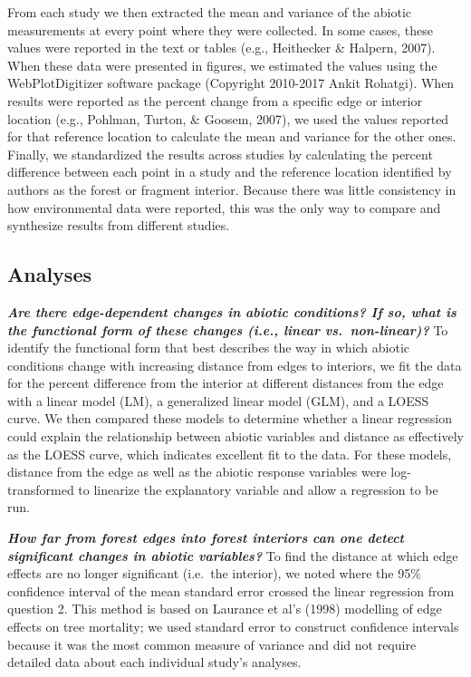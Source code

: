 \documentclass[
  man]{apa6}
\begin{document}
From each study we then extracted the mean and variance of the abiotic measurements at every point where they were collected. In some cases, these values were reported in the text or tables (e.g., Heithecker \& Halpern, 2007). When these data were presented in figures, we estimated the values using the WebPlotDigitizer software package (Copyright 2010-2017 Ankit Rohatgi). When results were reported as the percent change from a specific edge or interior location (e.g., Pohlman, Turton, \& Goosem, 2007), we used the values reported for that reference location to calculate the mean and variance for the other ones. Finally, we standardized the results across studies by calculating the percent difference between each point in a study and the reference location identified by authors as the forest or fragment interior. Because there was little consistency in how environmental data were reported, this was the only way to compare and synthesize results from different studies.

\subsection{Analyses}\label{analyses}

\textbf{\emph{Are there edge-dependent changes in abiotic conditions? If so, what is the functional form of these changes (i.e., linear vs.~non-linear)?}} To identify the functional form that best describes the way in which abiotic conditions change with increasing distance from edges to interiors, we fit the data for the percent difference from the interior at different distances from the edge with a linear model (LM), a generalized linear model (GLM), and a LOESS curve. We then compared these models to determine whether a linear regression could explain the relationship between abiotic variables and distance as effectively as the LOESS curve, which indicates excellent fit to the data. For these models, distance from the edge as well as the abiotic response variables were log-transformed to linearize the explanatory variable and allow a regression to be run.

\textbf{\emph{How far from forest edges into forest interiors can one detect significant changes in abiotic variables?}} To find the distance at which edge effects are no longer significant (i.e.~the interior), we noted where the 95\% confidence interval of the mean standard error crossed the linear regression from question 2. This method is based on Laurance et al's (1998) modelling of edge effects on tree mortality; we used standard error to construct confidence intervals because it was the most common measure of variance and did not require detailed data about each individual study's analyses.
\end{document}
